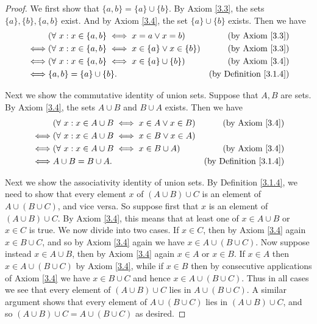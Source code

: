 \begin{proof}
    We first show that \(\{a, b\} = \{a\} \cup \{b\}\).
    By Axiom \ref{3.3}, the sets \(\{a\}, \{b\}, \{a, b\}\) exist.
    And by Axiom \ref{3.4}, the set \(\{a\} \cup \{b\}\) exists.
    Then we have
    \begin{align*}
             & (\forall\ x : x \in \{a, b\} \iff x = a \lor x = b)             & \text{(by Axiom \ref{3.3})}        \\
        \iff & (\forall\ x : x \in \{a, b\} \iff x \in \{a\} \lor x \in \{b\}) & \text{(by Axiom \ref{3.3})}        \\
        \iff & (\forall\ x : x \in \{a, b\} \iff x \in \{a\} \cup \{b\})       & \text{(by Axiom \ref{3.4})}        \\
        \iff & \{a, b\} = \{a\} \cup \{b\}.                                    & \text{(by Definition \ref{3.1.4})}
    \end{align*}

    Next we show the commutative identity of union sets.
    Suppose that \(A, B\) are sets.
    By Axiom \ref{3.4}, the sets \(A \cup B\) and \(B \cup A\) exists.
    Then we have
    \begin{align*}
             & (\forall\ x : x \in A \cup B \iff x \in A \lor x \in B) & \text{(by Axiom \ref{3.4})}        \\
        \iff & (\forall\ x : x \in A \cup B \iff x \in B \lor x \in A)                                      \\
        \iff & (\forall\ x : x \in A \cup B \iff x \in B \cup A)       & \text{(by Axiom \ref{3.4})}        \\
        \iff & A \cup B = B \cup A.                                    & \text{(by Definition \ref{3.1.4})}
    \end{align*}

    Next we show the associativity identity of union sets.
    By Definition \ref{3.1.4}, we need to show that every element \(x\) of \((A \cup B) \cup C\) is an element of \(A \cup (B \cup C)\), and vice versa.
    So suppose first that \(x\) is an element of \((A \cup B) \cup C\).
    By Axiom \ref{3.4}, this means that at least one of \(x \in A \cup B\) or \(x \in C\) is true.
    We now divide into two cases.
    If \(x \in C\), then by Axiom \ref{3.4} again \(x \in B \cup C\), and so by Axiom \ref{3.4} again we have \(x \in A \cup (B \cup C)\).
    Now suppose instead \(x \in A \cup B\), then by Axiom \ref{3.4} again \(x \in A\) or \(x \in B\).
    If \(x \in A\) then \(x \in A \cup (B \cup C)\) by Axiom \ref{3.4}, while if \(x \in B\) then by consecutive applications of Axiom \ref{3.4} we have \(x \in B \cup C\) and hence \(x \in A \cup (B \cup C)\).
    Thus in all cases we see that every element of \((A \cup B) \cup C\) lies in \(A \cup (B \cup C)\).
    A similar argument shows that every element of \(A \cup (B \cup C)\) lies in \((A \cup B) \cup C\), and so \((A \cup B) \cup C = A \cup (B \cup C) \) as desired.


\end{proof}
